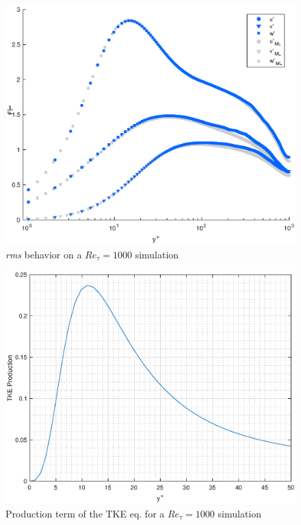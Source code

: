 \begin{figure}
\begin{center}
\includegraphics[scale=0.55]{grafici/rms_1000.eps}
\caption{\emph{rms} behavior on a $Re_{\tau}=1000$ simulation}
\label{rms:1000}
\end{center} 
\end{figure}

\begin{figure}
\begin{center}
\includegraphics[scale=0.55]{grafici/tke_prod_1000.eps}
\caption{Production term of the TKE eq. for a $Re_{\tau}=1000$ simulation}
\label{tke:prod:1000}
\end{center} 
\end{figure}

